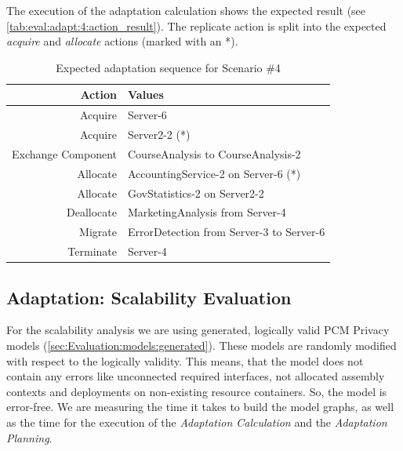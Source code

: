 The execution of the adaptation calculation shows the expected result (see \autoref{tab:eval:adapt:4:action_result}). The replicate action is split into the expected \textit{acquire} and \textit{allocate} actions (marked with an *).

\begin{table}[h]
	\centering
	\begin{tabular}{r | l }
		\hline
		\textbf{Action} & \textbf{Values}\\
		\hline
		Acquire & Server-6\\
		Acquire & Server2-2 (*)\\
		Exchange Component & CourseAnalysis to CourseAnalysis-2\\
		Allocate & AccountingService-2 on Server-6 (*)\\
		Allocate & GovStatistics-2 on Server2-2\\
		Deallocate & MarketingAnalysis from Server-4\\
		Migrate & ErrorDetection from Server-3 to Server-6\\
		Terminate & Server-4\\
		\hline
	\end{tabular}
	\caption{Expected adaptation sequence for Scenario \#4}
	\label{tab:eval:adapt:4:action_result}
\end{table}



\subsection{Adaptation: Scalability Evaluation}

For the scalability analysis we are using generated, logically valid PCM Privacy models (\autoref{sec:Evaluation:models:generated}). These models are randomly modified with respect to the logically validity. This means, that the model does not contain any errors like unconnected required interfaces, not allocated assembly contexts and deployments on non-existing resource containers. So, the model is error-free. We are measuring the time it takes to build the model graphs, as well as the time for the execution of the \textit{Adaptation Calculation} and the \textit{Adaptation Planning}.

